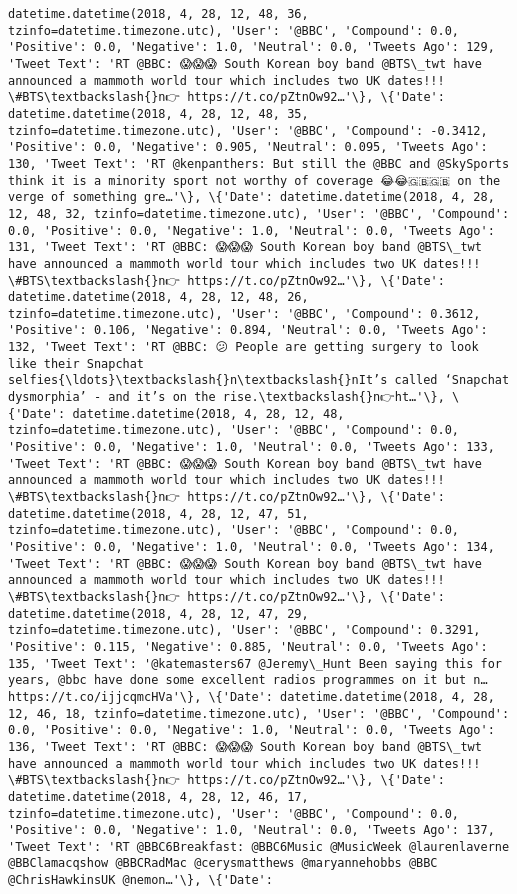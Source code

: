 \documentclass[11pt]{article}
\begin{document}
\begin{Verbatim}[commandchars=\\\{\}]
datetime.datetime(2018, 4, 28, 12, 48, 36, tzinfo=datetime.timezone.utc), 'User': '@BBC', 'Compound': 0.0, 'Positive': 0.0, 'Negative': 1.0, 'Neutral': 0.0, 'Tweets Ago': 129, 'Tweet Text': 'RT @BBC: 😱😱😱 South Korean boy band @BTS\_twt have announced a mammoth world tour which includes two UK dates!!! \#BTS\textbackslash{}n👉 https://t.co/pZtnOw92…'\}, \{'Date': datetime.datetime(2018, 4, 28, 12, 48, 35, tzinfo=datetime.timezone.utc), 'User': '@BBC', 'Compound': -0.3412, 'Positive': 0.0, 'Negative': 0.905, 'Neutral': 0.095, 'Tweets Ago': 130, 'Tweet Text': 'RT @kenpanthers: But still the @BBC and @SkySports think it is a minority sport not worthy of coverage 😂😂🇬🇧🇬🇧 on the verge of something gre…'\}, \{'Date': datetime.datetime(2018, 4, 28, 12, 48, 32, tzinfo=datetime.timezone.utc), 'User': '@BBC', 'Compound': 0.0, 'Positive': 0.0, 'Negative': 1.0, 'Neutral': 0.0, 'Tweets Ago': 131, 'Tweet Text': 'RT @BBC: 😱😱😱 South Korean boy band @BTS\_twt have announced a mammoth world tour which includes two UK dates!!! \#BTS\textbackslash{}n👉 https://t.co/pZtnOw92…'\}, \{'Date': datetime.datetime(2018, 4, 28, 12, 48, 26, tzinfo=datetime.timezone.utc), 'User': '@BBC', 'Compound': 0.3612, 'Positive': 0.106, 'Negative': 0.894, 'Neutral': 0.0, 'Tweets Ago': 132, 'Tweet Text': 'RT @BBC: 😕 People are getting surgery to look like their Snapchat selfies{\ldots}\textbackslash{}n\textbackslash{}nIt’s called ‘Snapchat dysmorphia’ - and it’s on the rise.\textbackslash{}n👉ht…'\}, \{'Date': datetime.datetime(2018, 4, 28, 12, 48, tzinfo=datetime.timezone.utc), 'User': '@BBC', 'Compound': 0.0, 'Positive': 0.0, 'Negative': 1.0, 'Neutral': 0.0, 'Tweets Ago': 133, 'Tweet Text': 'RT @BBC: 😱😱😱 South Korean boy band @BTS\_twt have announced a mammoth world tour which includes two UK dates!!! \#BTS\textbackslash{}n👉 https://t.co/pZtnOw92…'\}, \{'Date': datetime.datetime(2018, 4, 28, 12, 47, 51, tzinfo=datetime.timezone.utc), 'User': '@BBC', 'Compound': 0.0, 'Positive': 0.0, 'Negative': 1.0, 'Neutral': 0.0, 'Tweets Ago': 134, 'Tweet Text': 'RT @BBC: 😱😱😱 South Korean boy band @BTS\_twt have announced a mammoth world tour which includes two UK dates!!! \#BTS\textbackslash{}n👉 https://t.co/pZtnOw92…'\}, \{'Date': datetime.datetime(2018, 4, 28, 12, 47, 29, tzinfo=datetime.timezone.utc), 'User': '@BBC', 'Compound': 0.3291, 'Positive': 0.115, 'Negative': 0.885, 'Neutral': 0.0, 'Tweets Ago': 135, 'Tweet Text': '@katemasters67 @Jeremy\_Hunt Been saying this for years, @bbc have done some excellent radios programmes on it but n… https://t.co/ijjcqmcHVa'\}, \{'Date': datetime.datetime(2018, 4, 28, 12, 46, 18, tzinfo=datetime.timezone.utc), 'User': '@BBC', 'Compound': 0.0, 'Positive': 0.0, 'Negative': 1.0, 'Neutral': 0.0, 'Tweets Ago': 136, 'Tweet Text': 'RT @BBC: 😱😱😱 South Korean boy band @BTS\_twt have announced a mammoth world tour which includes two UK dates!!! \#BTS\textbackslash{}n👉 https://t.co/pZtnOw92…'\}, \{'Date': datetime.datetime(2018, 4, 28, 12, 46, 17, tzinfo=datetime.timezone.utc), 'User': '@BBC', 'Compound': 0.0, 'Positive': 0.0, 'Negative': 1.0, 'Neutral': 0.0, 'Tweets Ago': 137, 'Tweet Text': 'RT @BBC6Breakfast: @BBC6Music @MusicWeek @laurenlaverne @BBClamacqshow @BBCRadMac @cerysmatthews @maryannehobbs @BBC @ChrisHawkinsUK @nemon…'\}, \{'Date': 
\end{Verbatim}
\end{document}

